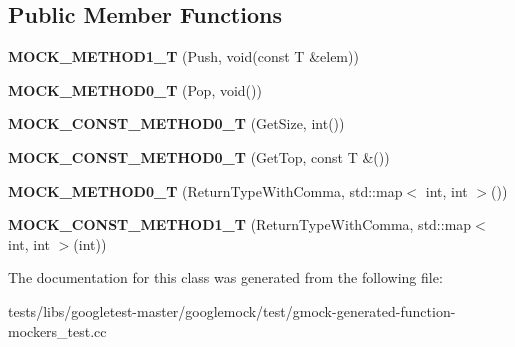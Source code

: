 \subsection*{Public Member Functions}
\begin{DoxyCompactItemize}
\item 
\mbox{\label{classtesting_1_1gmock__generated__function__mockers__test_1_1MockStack_a0ad833bc6134c5150b8271a5ba2e91b5}} 
{\bfseries M\+O\+C\+K\+\_\+\+M\+E\+T\+H\+O\+D1\+\_\+T} (Push, void(const T \&elem))
\item 
\mbox{\label{classtesting_1_1gmock__generated__function__mockers__test_1_1MockStack_a5e55ffb22e7f11c6940a97bd001bd50c}} 
{\bfseries M\+O\+C\+K\+\_\+\+M\+E\+T\+H\+O\+D0\+\_\+T} (Pop, void())
\item 
\mbox{\label{classtesting_1_1gmock__generated__function__mockers__test_1_1MockStack_a6171be20e8e4f44464cc8968e05b7c7a}} 
{\bfseries M\+O\+C\+K\+\_\+\+C\+O\+N\+S\+T\+\_\+\+M\+E\+T\+H\+O\+D0\+\_\+T} (Get\+Size, int())
\item 
\mbox{\label{classtesting_1_1gmock__generated__function__mockers__test_1_1MockStack_ae5950cfac08382a0ffc7c3bd5aba405f}} 
{\bfseries M\+O\+C\+K\+\_\+\+C\+O\+N\+S\+T\+\_\+\+M\+E\+T\+H\+O\+D0\+\_\+T} (Get\+Top, const T \&())
\item 
\mbox{\label{classtesting_1_1gmock__generated__function__mockers__test_1_1MockStack_a4b67d1f5b795e7c072fb846217a8f130}} 
{\bfseries M\+O\+C\+K\+\_\+\+M\+E\+T\+H\+O\+D0\+\_\+T} (Return\+Type\+With\+Comma, std\+::map$<$ int, int $>$())
\item 
\mbox{\label{classtesting_1_1gmock__generated__function__mockers__test_1_1MockStack_a69b9a7d0231b729d8a47201a49fa9166}} 
{\bfseries M\+O\+C\+K\+\_\+\+C\+O\+N\+S\+T\+\_\+\+M\+E\+T\+H\+O\+D1\+\_\+T} (Return\+Type\+With\+Comma, std\+::map$<$ int, int $>$(int))
\end{DoxyCompactItemize}


The documentation for this class was generated from the following file\+:\begin{DoxyCompactItemize}
\item 
tests/libs/googletest-\/master/googlemock/test/gmock-\/generated-\/function-\/mockers\+\_\+test.\+cc\end{DoxyCompactItemize}
